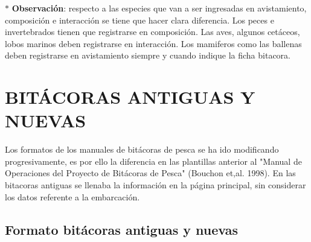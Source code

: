 \documentclass[a4paper,oneside,11pt]{book}
\begin{document}
$\ast$ \textbf{Observación}: respecto a las especies que van a ser ingresadas en avistamiento, composición e interacción se tiene que hacer clara diferencia. Los peces e invertebrados tienen que registrarse en composición. Las aves, algunos cetáceos, lobos marinos deben registrarse en interacción. Los mamiferos como las ballenas deben registrarse en avistamiento siempre y cuando indique la ficha bitacora.


\chapter{ BITÁCORAS ANTIGUAS Y NUEVAS}
Los formatos de los manuales de bitácoras de pesca se ha ido modificando progresivamente, es  por ello la diferencia en las plantillas anterior al "Manual de Operaciones del Proyecto de Bitácoras de Pesca" (Bouchon et,al. 1998). En las bitacoras antiguas se llenaba la información en la página principal, sin considerar los datos referente a la embarcación.

\section{Formato bitácoras antiguas y nuevas}
\end{document}
